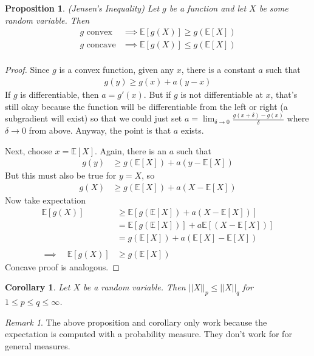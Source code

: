 \documentclass[12pt]{article}
\theoremstyle{plain}
\newtheorem{prop}[thm]{Proposition}
\newtheorem{cor}[thm]{Corollary}
\theoremstyle{definition}
\theoremstyle{remark}
\newtheorem*{rmk}{Remark}
\newcommand{\ra}{\rightarrow}
\newcommand{\E}{\mathbb{E}}
\begin{document}
\begin{prop}{\emph{(Jensen's Inequality)}}
Let $g$ be a function and let $X$ be some random variable. Then
\begin{align*}
  \text{$g$ convex} &\implies \E[g(X)] \geq g\left(\E[X]\right) \\
  \text{$g$ concave} &\implies \E[g(X)] \leq g\left(\E[X]\right) \\
\end{align*}
\end{prop}
\begin{proof}
Since $g$ is a convex function, given any $x$, there is a constant $a$
such that
\begin{align*}
  g(y) \geq g(x) + a (y-x)
\end{align*}
If $g$ is differentiable, then $a=g'(x)$. But if $g$ is not
differentiable at $x$, that's still okay because the function will be
differentiable from the left or right (a subgradient will exist) so that
we could just set
$a=\lim_{\delta \ra 0} \frac{g(x+\delta)-g(x)}{\delta}$ where
$\delta\ra 0$ from above. Anyway, the point is that $a$ exists.

Next, choose $x=\E[X]$. Again, there is an $a$ such that
\begin{align*}
  g(y) &\geq g(\E[X]) + a (y-\E[X])
\end{align*}
But this must also be true for $y=X$, so
\begin{align*}
  g(X) &\geq g(\E[X]) + a (X-\E[X])
\end{align*}
Now take expectation
\begin{align*}
  \E[g(X)]
  &\geq \E[g(\E[X]) + a (X-\E[X])] \\
  &= \E[g(\E[X])] + a \E[(X-\E[X])] \\
  &= g(\E[X]) + a (\E[X]-\E[X]) \\\\
  \implies \quad
  \E[g(X)] &\geq g(\E[X])
\end{align*}
Concave proof is analogous.
\end{proof}

\begin{cor}
Let $X$ be a random variable. Then $||X||_p\leq ||X||_q$ for
$1\leq p\leq q\leq \infty$.
\end{cor}

\begin{rmk}
The above proposition and corollary only work because the expectation is
computed with a probability measure. They don't work for for general
measures.
\end{rmk}
\end{document}
